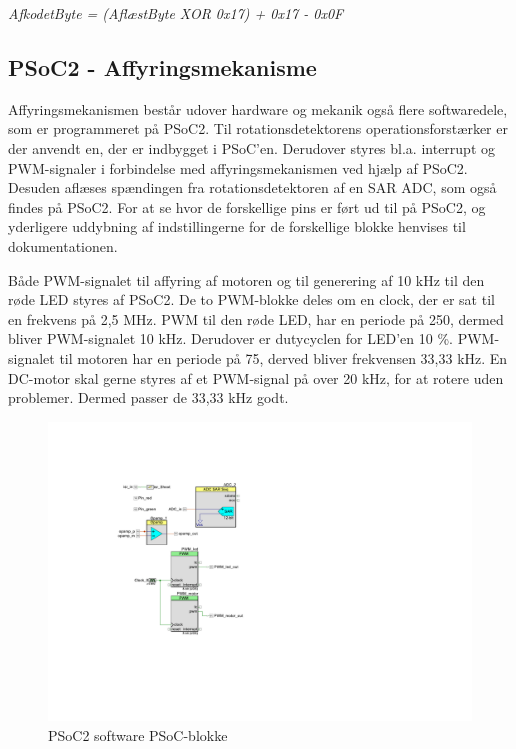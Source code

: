 \textit{AfkodetByte = (AflæstByte XOR 0x17) + 0x17 - 0x0F}


\subsection{PSoC2 - Affyringsmekanisme}

Affyringsmekanismen består udover hardware og mekanik også flere softwaredele, som er programmeret på PSoC2. Til rotationsdetektorens operationsforstærker er der anvendt en, der er indbygget i PSoC'en. Derudover styres bl.a. interrupt og PWM-signaler i forbindelse med affyringsmekanismen ved hjælp af PSoC2. Desuden aflæses spændingen fra rotationsdetektoren af en SAR ADC, som også findes på PSoC2. For at se hvor de forskellige pins er ført ud til på PSoC2, og yderligere uddybning af indstillingerne for de forskellige blokke henvises til dokumentationen.

 

Både PWM-signalet til affyring af motoren og til generering af 10 kHz til den røde LED styres af PSoC2. De to PWM-blokke deles om en clock, der er sat til en frekvens på 2,5 MHz. PWM til den røde LED, har en periode på 250, dermed bliver PWM-signalet 10 kHz. Derudover er dutycyclen for LED'en 10 \%. PWM-signalet til motoren har en periode på 75, derved bliver frekvensen 33,33 kHz. En DC-motor skal gerne styres af et PWM-signal på over 20 kHz, for at rotere uden problemer. Dermed passer de 33,33 kHz godt.


\begin{figure}[H]
	\centering
	\includegraphics[width=2.7\textwidth, trim={5cm 5.7cm 0 4.3cm}]{Afsnit/DesignOgImplementering/images/PSoC2blokke}
	\caption{PSoC2 software PSoC-blokke} 
	\label{fig:PSoC2blokke}
\end{figure}


